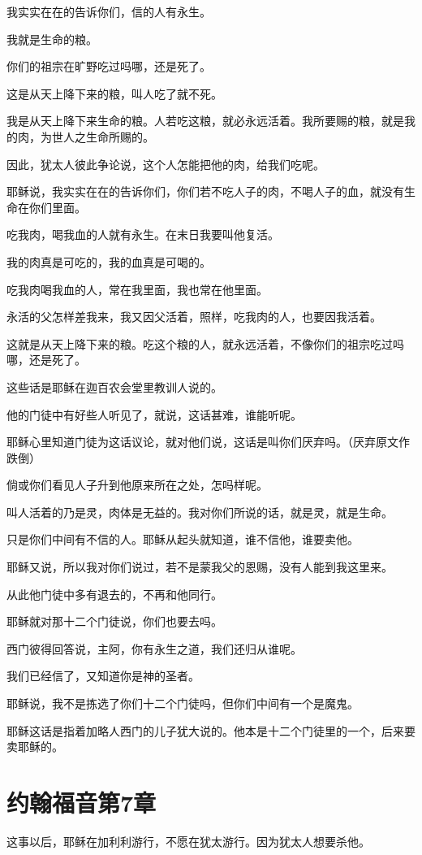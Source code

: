 \documentclass[12pt,oneside]{book}
\begin{document}
我实实在在的告诉你们，信的人有永生。

我就是生命的粮。

你们的祖宗在旷野吃过吗哪，还是死了。

这是从天上降下来的粮，叫人吃了就不死。

我是从天上降下来生命的粮。人若吃这粮，就必永远活着。我所要赐的粮，就是我的肉，为世人之生命所赐的。

因此，犹太人彼此争论说，这个人怎能把他的肉，给我们吃呢。

耶稣说，我实实在在的告诉你们，你们若不吃人子的肉，不喝人子的血，就没有生命在你们里面。

吃我肉，喝我血的人就有永生。在末日我要叫他复活。

我的肉真是可吃的，我的血真是可喝的。

吃我肉喝我血的人，常在我里面，我也常在他里面。

永活的父怎样差我来，我又因父活着，照样，吃我肉的人，也要因我活着。

这就是从天上降下来的粮。吃这个粮的人，就永远活着，不像你们的祖宗吃过吗哪，还是死了。

这些话是耶稣在迦百农会堂里教训人说的。

他的门徒中有好些人听见了，就说，这话甚难，谁能听呢。

耶稣心里知道门徒为这话议论，就对他们说，这话是叫你们厌弃吗。（厌弃原文作跌倒）

倘或你们看见人子升到他原来所在之处，怎吗样呢。

叫人活着的乃是灵，肉体是无益的。我对你们所说的话，就是灵，就是生命。

只是你们中间有不信的人。耶稣从起头就知道，谁不信他，谁要卖他。

耶稣又说，所以我对你们说过，若不是蒙我父的恩赐，没有人能到我这里来。

从此他门徒中多有退去的，不再和他同行。

耶稣就对那十二个门徒说，你们也要去吗。

西门彼得回答说，主阿，你有永生之道，我们还归从谁呢。

我们已经信了，又知道你是神的圣者。

耶稣说，我不是拣选了你们十二个门徒吗，但你们中间有一个是魔鬼。

耶稣这话是指着加略人西门的儿子犹大说的。他本是十二个门徒里的一个，后来要卖耶稣的。

\chapter{约翰福音第7章}
这事以后，耶稣在加利利游行，不愿在犹太游行。因为犹太人想要杀他。
\end{document}

